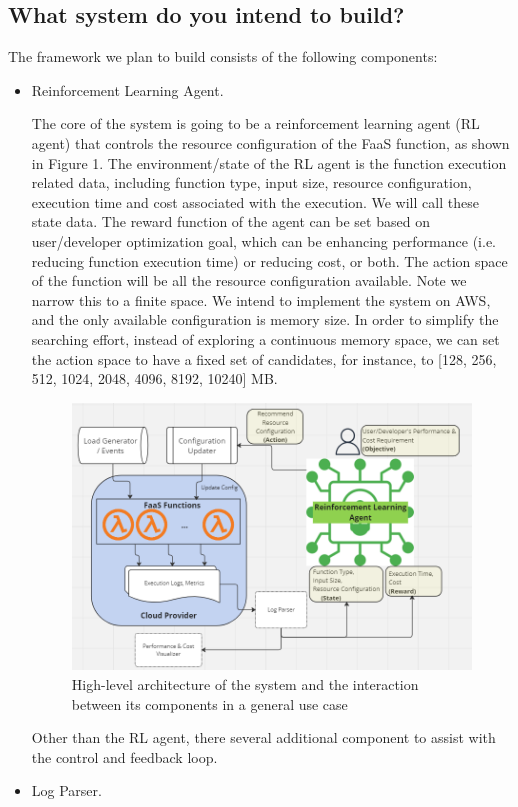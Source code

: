 \documentclass[conference]{IEEEtran}
\begin{document}
\subsection{What system do you intend to build?}
The framework we plan to build consists of the following components:
\begin{itemize}
\item Reinforcement Learning Agent.

The core of the system is going to be a reinforcement learning agent (RL agent) that controls the resource configuration of the FaaS function, as shown in Figure 1. The environment/state of the RL agent is the function execution related data, including function type, input size,  resource configuration, execution time and cost associated with the execution. We will call these state data. The reward function of the agent can be set based on user/developer optimization goal, which can be enhancing performance (i.e. reducing function execution time) or reducing cost, or both. The action space of the function will be all the resource configuration available. Note we narrow this to a finite space. We intend to implement the system on AWS, and the only available configuration is memory size. In order to simplify the searching effort, instead of exploring a continuous memory space, we can set the action space to have a fixed set of candidates, for instance,  to [128, 256, 512, 1024, 2048, 4096, 8192, 10240] MB.
\begin{figure}
    \centering
    \includegraphics[width=1\linewidth]{System Architecture.PNG}
    \caption{High-level architecture of the system and the interaction
between its components in a general use case}
    \label{fig:enter-label}
\end{figure}
Other than the RL agent, there several additional component to assist with the control and feedback loop. 
\item Log Parser.


\end{itemize}
\end{document}
